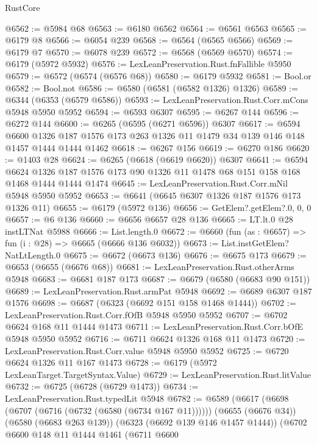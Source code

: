 \begin{lexlean}{RustCore}
\begin{coremodule}
@6562 := @5984 @68
@6563 := @6180 @6562
@6564 := @6561 @6563
@6565 := @6179 @8
@6566 := @6054 @239
@6568 := @6564 (@6565 @6566)
@6569 := @6179 @7
@6570 := @6078 @239
@6572 := @6568 (@6569 @6570)
@6574 := @6179 (@5972 @5932)
@6576 := LexLeanPreservation.Rust.fnFallible @5950
@6579 := @6572 (@6574 (@6576 @68))
@6580 := @6179 @5932
@6581 := Bool.or
@6582 := Bool.not
@6586 := @6580 (@6581 (@6582 @1326) @1326)
@6589 := @6344 (@6353 (@6579 @6586))
@6593 := LexLeanPreservation.Rust.Corr.mCons @5948 @5950 @5952
@6594 := @6593 @6307
@6595 := @6267 @144
@6596 := @6272 @144
@6600 := @6265 (@6595 (@6271 @6596)) @6307
@6617 := @6594
    @6600
    @1326
    @187
    @1576
    @173
    @263
    @1326
    @11
    @1479
    @34
    @139
    @146
    @148
    @1457
    @1444
    @1444
    @1462
@6618 := @6267 @156
@6619 := @6270 @186
@6620 := @1403 @28
@6624 := @6265 (@6618 (@6619 @6620)) @6307
@6641 := @6594
    @6624
    @1326
    @187
    @1576
    @173
    @90
    @1326
    @11
    @1478
    @68
    @151
    @158
    @168
    @1468
    @1444
    @1444
    @1474
@6645 := LexLeanPreservation.Rust.Corr.mNil @5948 @5950 @5952
@6653 := @6641 (@6645 @6307 @1326 @187 @1576 @173 @1326 @11)
@6655 := @6179 (@5972 @136)
@6656 := GetElem?.getElem?.{0, 0, 0}
@6657 := @6 @136
@6660 := @6656 @6657 @28 @136
@6665 := LT.lt.{0} @28 instLTNat @5988
@6666 := List.length.{0}
@6672 := @6660 (fun (as : @6657) => fun (i : @28) => @6665 (@6666 @136 @6032))
@6673 := List.instGetElem?NatLtLength.{0}
@6675 := @6672 (@6673 @136)
@6676 := @6675 @173
@6679 := @6653 (@6655 (@6676 @68))
@6681 := LexLeanPreservation.Rust.otherArms @5948
@6683 := @6681 @187 @173
@6687 := @6679 (@6580 (@6683 @90 @151))
@6689 := LexLeanPreservation.Rust.armPat @5948
@6692 := @6689 @6307 @187 @1576
@6698 := @6687 (@6323 (@6692 @151 @158 @1468 @1444))
@6702 := LexLeanPreservation.Rust.Corr.fOfB @5948 @5950 @5952
@6707 := @6702 @6624 @168 @11 @1444 @1473
@6711 := LexLeanPreservation.Rust.Corr.bOfE @5948 @5950 @5952
@6716 := @6711 @6624 @1326 @168 @11 @1473
@6720 := LexLeanPreservation.Rust.Corr.value @5948 @5950 @5952
@6725 := @6720 @6624 @1326 @11 @167 @1473
@6728 := @6179 (@5972 LexLeanTarget.TargetSyntax.Value)
@6729 := LexLeanPreservation.Rust.litValue
@6732 := @6725 (@6728 (@6729 @1473))
@6734 := LexLeanPreservation.Rust.typedLit @5948
@6782 := @6589
    (@6617
      (@6698 (@6707 (@6716 (@6732 (@6580 (@6734 @167 @11))))))
      (@6655 (@6676 @34))
      (@6580 (@6683 @263 @139))
      (@6323 (@6692 @139 @146 @1457 @1444))
      (@6702
        @6600
        @148
        @11
        @1444
        @1461
        (@6711
          @6600

\end{coremodule}
\end{lexlean}
